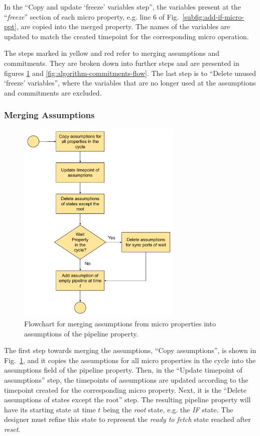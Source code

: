 In the “Copy and update ‘freeze’ variables step”, the variables present at the “\textit{freeze}” section of each micro property, e.g. line 6 of Fig.~\ref{subfig:add-if-micro-ppt}, are copied into the merged property. The names of the variables are updated to match the created timepoint for the corresponding micro operation.

The steps marked in yellow and red refer to merging assumptions and commitments. They are broken down into further steps and are presented in figures \ref{fig:algorithm-assumptions-flow} and \ref{fig:algorithm-commitments-flow}. The last step is to “Delete unused ‘freeze’ variables”, where the variables that are no longer used at the assumptions and commitments are excluded. 

\subsubsection*{Merging Assumptions}

\begin{figure}[htb!]
    \centering
	\includegraphics[width=0.7\textwidth]{images/algorithm_assumptions.pdf}
	\caption{Flowchart for merging assumptions from micro properties into assumptions of the pipeline property.}
	\label{fig:algorithm-assumptions-flow}
\end{figure}

The first step towards merging the assumptions, “Copy assumptions”, is shown in Fig.~\ref{fig:algorithm-assumptions-flow}, and it copies the assumptions for all micro properties in the cycle into the assumptions field of the pipeline property. Then, in the “Update timepoint of assumptions” step, the timepoints of assumptions are updated according to the timepoint created for the corresponding micro property. Next, it is the “Delete assumptions of states except the root” step. The resulting pipeline property will have its starting state at time $t$ being the \textit{root} state, e.g. the \textit{IF} state. The designer must refine this state to represent the \textit{ready to fetch} state reached after \textit{reset}.

